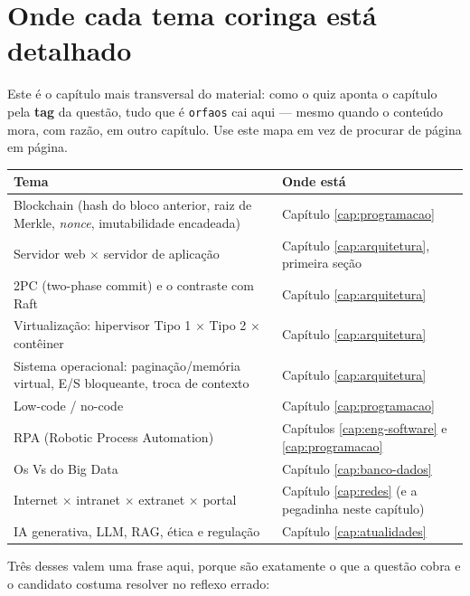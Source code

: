 \section{Onde cada tema coringa está detalhado}

Este é o capítulo mais transversal do material: como o quiz aponta o capítulo
pela \textbf{tag} da questão, tudo que é \texttt{orfaos} cai aqui --- mesmo
quando o conteúdo mora, com razão, em outro capítulo. Use este mapa em vez de
procurar de página em página.

\begin{center}
\begin{tabular}{@{}p{4.4cm}p{6.6cm}@{}}
\toprule
\textbf{Tema} & \textbf{Onde está} \\
\midrule
Blockchain (hash do bloco anterior, raiz de Merkle, \emph{nonce},
imutabilidade encadeada) & Capítulo \ref{cap:programacao} \\
Servidor web $\times$ servidor de aplicação & Capítulo \ref{cap:arquitetura},
primeira seção \\
2PC (two-phase commit) e o contraste com Raft & Capítulo
\ref{cap:arquitetura} \\
Virtualização: hipervisor Tipo 1 $\times$ Tipo 2 $\times$ contêiner &
Capítulo \ref{cap:arquitetura} \\
Sistema operacional: paginação/memória virtual, E/S bloqueante, troca de
contexto & Capítulo \ref{cap:arquitetura} \\
Low-code / no-code & Capítulo \ref{cap:programacao} \\
RPA (Robotic Process Automation) & Capítulos \ref{cap:eng-software} e
\ref{cap:programacao} \\
Os Vs do Big Data & Capítulo \ref{cap:banco-dados} \\
Internet $\times$ intranet $\times$ extranet $\times$ portal & Capítulo
\ref{cap:redes} (e a pegadinha neste capítulo) \\
IA generativa, LLM, RAG, ética e regulação & Capítulo \ref{cap:atualidades} \\
\bottomrule
\end{tabular}
\end{center}

Três desses valem uma frase aqui, porque são exatamente o que a questão
cobra e o candidato costuma resolver no reflexo errado:

